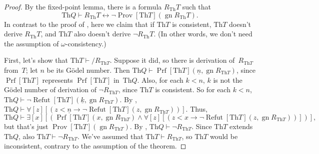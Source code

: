 \documentclass[10pt,a4paper]{article}
\newcommand*{\olup}[1]{#1}   %
\theoremstyle{plain}
\theoremstyle{definition}
\theoremstyle{remark}
\newcommand*{\ollabel}[1]{\label{#1}}
\providecommand{\lif}{\mathbin{\rightarrow}}
\providecommand{\lforall}{\mathord{\forall}}
\providecommand{\lexists}{\mathord{\exists}}
\providecommand{\Proves}{\mathrel{\vdash}}
\providecommand{\formula}{\relax}
\providecommand{\Th}{\ensuremath{\mathrm{Th}}}
\providecommand{\num}[1]{\underline{#1}}
\providecommand{\Prf}{\operatorname{Prf}}
\providecommand{\gn}{\operatorname{gn}}
\providecommand{\liff}{\mathbin{\leftrightarrow}}
\providecommand{\OPrf}{\operatorname{Prf}}
\providecommand{\formula}[1]{#1}
\providecommand{\ORefut}{\operatorname{Refut}}
\providecommand{\ORProv}{\operatorname{Prov}}
\providecommand{\lforall}{}
\providecommand{\lexists}{}
\providecommand{\num}{}
\renewcommand{\olup}[1]{#1}
\begin{document}
\begin{proof}
By the fixed-point lemma, there is a formula $R_\Th{T}$ such that
\begin{equation}
  \Th{Q} \Proves R_\Th{T} \liff \lnot \ORProv[\Th{T}](\gn{R_\Th{T}}).
  \ollabel{RT}
\end{equation}
In contrast to the proof of ,
here we claim that if $\Th{T}$ is consistent, $\Th{T}$ doesn't \olup{derive}
$R_\Th{T}$, and $\Th{T}$ also doesn't \olup{derive} $\lnot R_\Th{T}$. (In
other words, we don't need the assumption of $\omega$-consistency.)

First, let's show that $\Th{T} \Proves/ R_{\Th{T}}$.  Suppose it did, so
there is \olup{derivation} of~$R_{\Th{T}}$ from~$T$; let $n$ be its G\"odel
number. Then $\Th{Q} \Proves \OPrf[\Th{T}](\num{n}, \gn{R_{\Th{T}}})$, since
$\OPrf[\Th{T}]$ represents $\Prf[\Th{T}]$ in~$\Th{Q}$. Also, for each $k < n$,
$k$ is not the G\"odel number of \olup{derivation} of $\lnot R_{\Th{T}}$, since $\Th{T}$ is
consistent. So for each $k < n$, $\Th{Q} \Proves \lnot
\ORefut[\Th{T}](\num{k}, \gn{R_{\Th{T}}})$. By ,
$\Th{Q} \Proves \lforall[z][(z < \num{n} \lif \lnot \ORefut[\Th{T}](z,
  \gn{R_{\Th{T}}}))]$. Thus,
\[
\Th{Q} \Proves \lexists[x][(\OPrf[\Th{T}](x,\gn{R_{\Th{T}}}) \land \lforall[z][(z
    < x \lif \lnot \ORefut[\Th{T}](z,\gn{R_{\Th{T}}}))])],
\]
but that's just $\ORProv[\Th{T}](\gn{R_{\Th{T}}})$. By , $\Th{Q}
\Proves \lnot R_{\Th{T}}$. Since $\Th{T}$ extends $\Th{Q}$, also $\Th{T}
\Proves \lnot R_{\Th{T}}$. We've assumed that $\Th{T} \Proves R_{\Th{T}}$, so
$\Th{T}$ would be inconsistent, contrary to the assumption of the
theorem.


\end{proof}
\end{document}
